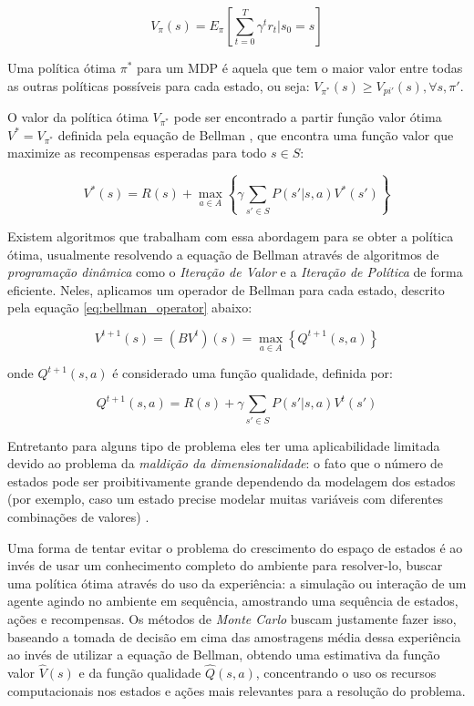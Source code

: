 \documentclass[letterpaper]{article}
\begin{document}
\begin{equation} \label{eq:total_expected_reward}
    V_\pi(s) = E_{\pi} \left[ \sum_{t=0}^{T} \gamma^t r_t | s_0 = s \right]
\end{equation}

Uma política ótima $\pi^*$ para um MDP é aquela que tem o maior valor entre todas as outras políticas possíveis para cada estado, ou seja: $V_{\pi^*}(s) \geq V_{pi'}(s), \forall s,\pi'$.

O valor da política ótima $V_{\pi^*}$ pode ser encontrado a partir função valor ótima $V^* = V_{\pi^*}$ definida pela equação de Bellman \cite{Bellman-1966}, que encontra uma função valor que maximize as recompensas esperadas para todo $s \in S$:

\begin{equation} \label{eq:bellman_equation}
    V^*(s) = R(s) + \max_{a \in A} \left\{ \gamma \sum_{s'\in S} P(s'|s,a)V^*(s') \right\}
\end{equation}

Existem algoritmos que trabalham com essa abordagem para se obter a política ótima, usualmente resolvendo a equação de Bellman através de algoritmos de \textit{programação dinâmica} como o \textit{Iteração de Valor} e a \textit{Iteração de Política} \cite{Howard-1960} de forma eficiente. Neles, aplicamos um operador de Bellman para cada estado, descrito pela equação \ref{eq:bellman_operator} abaixo: 

\begin{equation} \label{eq:bellman_operator}
  V^{t+1}(s) = (BV^t)(s) = \max_{a \in A} \left\{ Q^{t+1}(s,a) \right\}
\end{equation}

onde $ Q^{t+1}(s,a) $ é considerado uma função qualidade, definida por:

\begin{equation} \label{eq:quality_function}
  Q^{t+1}(s,a) = R(s) + \gamma \sum_{s'\in S} P(s'|s,a)V^t(s')
\end{equation}

Entretanto para alguns tipo de problema eles ter uma aplicabilidade limitada devido ao problema da \textit{maldição da dimensionalidade}: o fato que o número de estados pode ser proibitivamente grande dependendo da modelagem dos estados (por exemplo, caso um estado precise modelar muitas variáveis com diferentes combinações de valores) \cite{SuttonBarto-2018}. 

Uma forma de tentar evitar o problema do crescimento do espaço de estados é ao invés de usar um conhecimento completo do ambiente para resolver-lo, buscar uma política ótima através do uso da experiência: a simulação ou interação de um agente agindo no ambiente em sequência, amostrando uma sequência de estados, ações e recompensas. Os métodos de \textit{Monte Carlo} buscam justamente fazer isso, baseando a tomada de decisão em cima das amostragens média dessa experiência ao invés de utilizar a equação de Bellman, obtendo uma estimativa da função valor $\hat{V}(s)$ e da função qualidade $\hat{Q}(s,a)$, concentrando o uso os recursos computacionais nos estados e ações mais relevantes para a resolução do problema.
\end{document}
